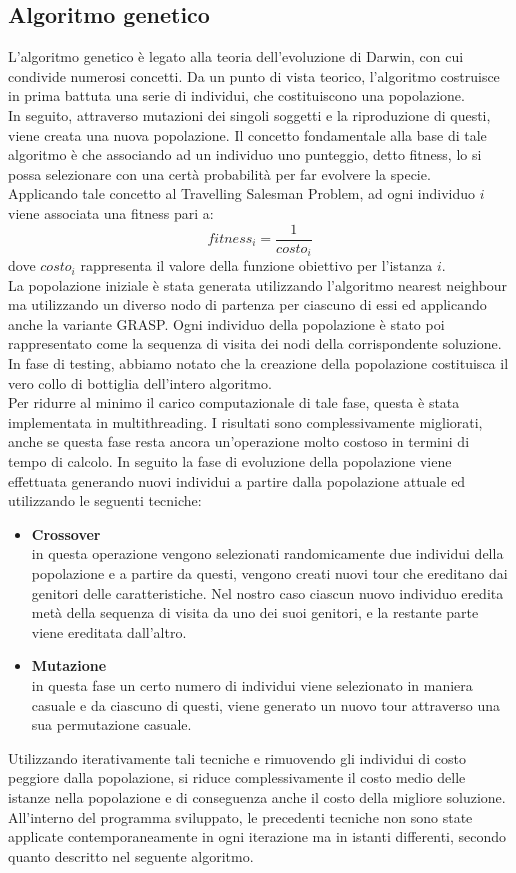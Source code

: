 \subsection{Algoritmo genetico}
L'algoritmo genetico è legato alla teoria dell'evoluzione di Darwin, con cui condivide numerosi concetti. Da un punto di vista teorico, l'algoritmo costruisce in prima battuta una serie di individui, che costituiscono una popolazione.\\
In seguito, attraverso mutazioni dei singoli soggetti e la riproduzione di questi, viene creata una nuova popolazione. Il concetto fondamentale alla base di tale algoritmo è che associando ad un individuo uno punteggio, detto fitness, lo si possa selezionare con una certà probabilità per far evolvere la specie.\\
Applicando tale concetto al Travelling Salesman Problem, ad ogni individuo $i$ viene associata una fitness pari a:
$$fitness_i=\frac{1}{costo_i}$$
dove $costo_i$ rappresenta il valore della funzione obiettivo per l'istanza $i$.\\
La popolazione iniziale è stata generata utilizzando l'algoritmo nearest neighbour ma utilizzando un diverso nodo di partenza per ciascuno di essi ed applicando anche la variante GRASP. Ogni individuo della popolazione è stato poi rappresentato come la sequenza di visita dei nodi della corrispondente soluzione.\\
In fase di testing, abbiamo notato che la creazione della popolazione costituisca il vero collo di bottiglia dell'intero algoritmo.\\
Per ridurre al minimo il carico computazionale di tale fase, questa è stata implementata in multithreading. I risultati sono complessivamente migliorati, anche se questa fase resta ancora un'operazione molto costoso in termini di tempo di calcolo.
In seguito la fase di evoluzione della popolazione viene effettuata generando nuovi individui a partire dalla popolazione attuale ed utilizzando le seguenti tecniche:
\begin{itemize}
\item{\textbf{Crossover}\\
in questa operazione vengono selezionati randomicamente due individui della popolazione e a partire da questi, vengono creati nuovi tour che ereditano dai genitori delle caratteristiche. Nel nostro caso ciascun nuovo individuo eredita metà della sequenza di visita da uno dei suoi genitori, e la restante parte viene ereditata dall'altro.}
\item{\textbf{Mutazione}\\
in questa fase un certo numero di individui viene selezionato in maniera casuale e da ciascuno di questi, viene generato un nuovo tour attraverso una sua permutazione casuale.}
\end{itemize}
Utilizzando iterativamente tali tecniche e rimuovendo gli individui di costo peggiore dalla popolazione, si riduce complessivamente il costo medio delle istanze nella popolazione e di conseguenza anche il costo della migliore soluzione. All'interno del programma sviluppato, le precedenti tecniche non sono state applicate contemporaneamente in ogni iterazione ma in istanti differenti, secondo quanto descritto nel seguente algoritmo.\\

